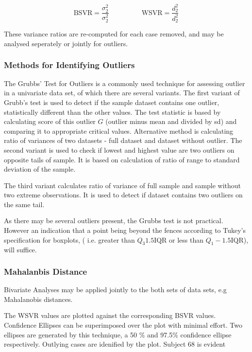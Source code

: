 \documentclass[12pt, a4paper]{report}
\theoremstyle{plain}
\theoremstyle{definition}
\theoremstyle{remark}
\begin{document}
	
	\[ \mbox{BSVR} = \frac{\sigma^2_2}{\sigma^2_2} \phantom{makespace}  \mbox{WSVR} = \frac{d^2_2}{d^2_2} \]
	
	These variance ratios are re-computed for each case removed, and may be analysed seperately or jointly for outliers.
	


	
	\subsubsection{Methods for Identifying Outliers}
	The Grubbs' Test for Outliers is a commonly used technique for assessing outlier in a univariate data set, of which there are several variants. The first variant of Grubb's test is used to detect if the sample dataset contains one outlier, statistically different than
	the other values. The test statistic is based by calculating score of this outlier $G$ (outlier minus mean and divided
	by sd) and comparing it to appropriate critical values. Alternative method is calculating ratio of
	variances of two datasets - full dataset and dataset without outlier.
	The second variant is used to check if lowest and highest value are two outliers on opposite tails of sample. It is based on calculation of ratio of range to standard deviation of the sample.
	
	The third variant calculates ratio of variance of full sample and sample without two extreme observations.
	It is used to detect if dataset contains two outliers on the same tail.
	
	As there may be several outliers present, the Grubbs test is not practical. However an indication that a point being beyond the fences according to Tukey's
	specification for boxplots, ( i.e. greater than $Q_3 1.5 \mbox{IQR}$ or less than $Q_1 - 1.5 \mbox{IQR}$), will suffice.
	
	


	\subsubsection{Mahalanbis Distance}
	Bivariate Analyses may be applied jointly to the both sets of data sets, e.g Mahalanobis distances.
	
	The WSVR values are plotted against the corresponding BSVR values. Confidence Ellipses can be superimposed over the plot with minimal effort. Two ellipses are generated by this technique, a 50 \% and 97.5\% confidence ellipse respectively. Outlying cases are idenified by the plot. Subject 68 is evident
	
\end{document}
